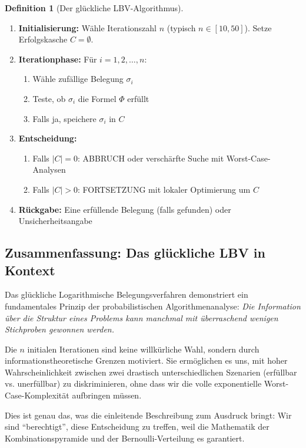 ﻿\documentclass[a4paper,12pt]{article}
\theoremstyle{definition}
\newtheorem{definition}{Definition}
\begin{document}
\begin{definition}[Der glückliche LBV-Algorithmus]
\begin{enumerate}
	\item \textbf{Initialisierung:} Wähle Iterationszahl $n$ (typisch $n \in [10, 50]$). Setze Erfolgskasche $C = \emptyset$.
	\item \textbf{Iterationphase:} Für $i = 1, 2, \ldots, n$:
	\begin{enumerate}
		\item Wähle zufällige Belegung $\sigma_i$
		\item Teste, ob $\sigma_i$ die Formel $\Phi$ erfüllt
		\item Falls ja, speichere $\sigma_i$ in $C$
	\end{enumerate}
	\item \textbf{Entscheidung:}
	\begin{enumerate}
		\item Falls $|C| = 0$: ABBRUCH oder verschärfte Suche mit Worst-Case-Analysen
		\item Falls $|C| > 0$: FORTSETZUNG mit lokaler Optimierung um $C$
	\end{enumerate}
	\item \textbf{Rückgabe:} Eine erfüllende Belegung (falls gefunden) oder Unsicherheitsangabe
\end{enumerate}
\end{definition}

\subsection{Zusammenfassung: Das glückliche LBV in Kontext}

Das glückliche Logarithmische Belegungsverfahren demonstriert ein fundamentales Prinzip der probabilistischen Algorithmenanalyse: \emph{Die Information über die Struktur eines Problems kann manchmal mit überraschend wenigen Stichproben gewonnen werden.} 

Die $n$ initialen Iterationen sind keine willkürliche Wahl, sondern durch informationstheoretische Grenzen motiviert. Sie ermöglichen es uns, mit hoher Wahrscheinlichkeit zwischen zwei drastisch unterschiedlichen Szenarien (erfüllbar vs. unerfüllbar) zu diskriminieren, ohne dass wir die volle exponentielle Worst-Case-Komplexität aufbringen müssen.

Dies ist genau das, was die einleitende Beschreibung zum Ausdruck bringt: Wir sind ``berechtigt'', diese Entscheidung zu treffen, weil die Mathematik der Kombinationspyramide und der Bernoulli-Verteilung es garantiert.
\end{document}
